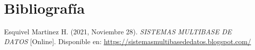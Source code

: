 \section{Bibliografía}


\begin{biblio}
	\item Esquivel Martinez H. (2021, Noviembre 28). \textit{SISTEMAS MULTIBASE DE DATOS} [Online]. Disponible en: \newline \textcolor{blue}{\underline{\url{https://sistemasmultibasededatos.blogspot.com/}}}
\end{biblio}